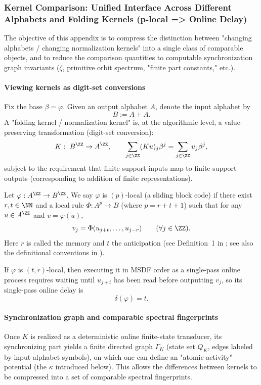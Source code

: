 \subsubsection{Kernel Comparison: Unified Interface Across Different Alphabets and Folding Kernels (p-local => Online Delay)}\label{app:sync-kernel-A-compare}
The objective of this appendix is to compress the distinction between "changing alphabets / changing normalization kernels" into a single class of comparable objects, and to reduce the comparison quantities to computable synchronization graph invariants ($\zeta$, primitive orbit spectrum, "finite part constants," etc.).

\paragraph{Viewing kernels as digit-set conversions}
Fix the base $\beta=\varphi$. Given an output alphabet $A$, denote the input alphabet by
\[
B:=A+A.
\]
A "folding kernel / normalization kernel" is, at the algorithmic level, a value-preserving transformation (digit-set conversion):
\[
K:\ B^{\ZZ}\to A^{\ZZ},
\qquad
\sum_{j\in\ZZ}(Ku)_j\beta^j=\sum_{j\in\ZZ}u_j\beta^j,
\]
subject to the requirement that finite-support inputs map to finite-support outputs (corresponding to addition of finite representations).

\begin{definition}\label{def:plocal}
Let $\varphi:A^{\ZZ}\to B^{\ZZ}$. We say $\varphi$ is $(p)$-local (a sliding block code) if there exist $r,t\in\NN$ and a local rule $\Phi:A^{p}\to B$ (where $p=r+t+1$) such that for any $u\in A^{\ZZ}$ and $v=\varphi(u)$,
\[
v_j=\Phi(u_{j+t},\dots,u_{j-r})\qquad(\forall j\in\ZZ).
\]
Here $r$ is called the memory and $t$ the anticipation (see Definition~1 in \cite{FrougnyHellerPelantovaSvobodovaParallelAlgorithmsSlides}; see also the definitional conventions in \cite{FrougnyPelantovaSvobodova2013MinimalDigitSets}).
\end{definition}

\begin{corollary}\label{cor:online-delay-from-plocal}
If $\varphi$ is $(t,r)$-local, then executing it in MSDF order as a single-pass online process requires waiting until $u_{j+t}$ has been read before outputting $v_j$, so its single-pass online delay is
\[
\delta(\varphi)=t.
\]
\end{corollary}

\paragraph{Synchronization graph and comparable spectral fingerprints}
Once $K$ is realized as a deterministic online finite-state transducer, its synchronizing part yields a finite directed graph $\Gamma_K$ (state set $Q_K$, edges labeled by input alphabet symbols), on which one can define an "atomic activity" potential (the $\kappa$ introduced below). This allows the differences between kernels to be compressed into a set of comparable spectral fingerprints.

